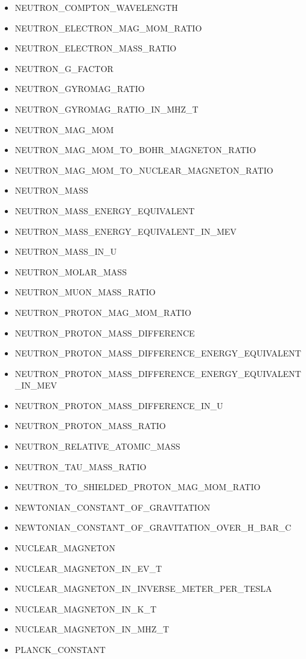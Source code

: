 \begin{itemize}
\item
  NEUTRON\_COMPTON\_WAVELENGTH
\item
  NEUTRON\_ELECTRON\_MAG\_MOM\_RATIO
\item
  NEUTRON\_ELECTRON\_MASS\_RATIO
\item
  NEUTRON\_G\_FACTOR
\item
  NEUTRON\_GYROMAG\_RATIO
\item
  NEUTRON\_GYROMAG\_RATIO\_IN\_MHZ\_T
\item
  NEUTRON\_MAG\_MOM
\item
  NEUTRON\_MAG\_MOM\_TO\_BOHR\_MAGNETON\_RATIO
\item
  NEUTRON\_MAG\_MOM\_TO\_NUCLEAR\_MAGNETON\_RATIO
\item
  NEUTRON\_MASS
\item
  NEUTRON\_MASS\_ENERGY\_EQUIVALENT
\item
  NEUTRON\_MASS\_ENERGY\_EQUIVALENT\_IN\_MEV
\item
  NEUTRON\_MASS\_IN\_U
\item
  NEUTRON\_MOLAR\_MASS
\item
  NEUTRON\_MUON\_MASS\_RATIO
\item
  NEUTRON\_PROTON\_MAG\_MOM\_RATIO
\item
  NEUTRON\_PROTON\_MASS\_DIFFERENCE
\item
  NEUTRON\_PROTON\_MASS\_DIFFERENCE\_ENERGY\_EQUIVALENT
\item
  NEUTRON\_PROTON\_MASS\_DIFFERENCE\_ENERGY\_EQUIVALENT\_IN\_MEV
\item
  NEUTRON\_PROTON\_MASS\_DIFFERENCE\_IN\_U
\item
  NEUTRON\_PROTON\_MASS\_RATIO
\item
  NEUTRON\_RELATIVE\_ATOMIC\_MASS
\item
  NEUTRON\_TAU\_MASS\_RATIO
\item
  NEUTRON\_TO\_SHIELDED\_PROTON\_MAG\_MOM\_RATIO
\item
  NEWTONIAN\_CONSTANT\_OF\_GRAVITATION
\item
  NEWTONIAN\_CONSTANT\_OF\_GRAVITATION\_OVER\_H\_BAR\_C
\item
  NUCLEAR\_MAGNETON
\item
  NUCLEAR\_MAGNETON\_IN\_EV\_T
\item
  NUCLEAR\_MAGNETON\_IN\_INVERSE\_METER\_PER\_TESLA
\item
  NUCLEAR\_MAGNETON\_IN\_K\_T
\item
  NUCLEAR\_MAGNETON\_IN\_MHZ\_T
\item
  PLANCK\_CONSTANT

\end{itemize}
